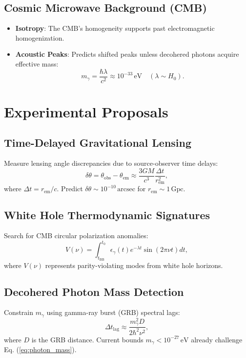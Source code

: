 \documentclass[12pt, a4paper]{article}
\begin{document}
\subsection{Cosmic Microwave Background (CMB)}
\begin{itemize}
\item \textbf{Isotropy}: The CMB's homogeneity supports past electromagnetic homogenization.
\item \textbf{Acoustic Peaks}: Predicts shifted peaks unless decohered photons acquire effective mass:
\begin{equation}
m_{\gamma} = \frac{\hbar \lambda}{c^2} \approx 10^{-33} \, \text{eV} \quad (\lambda \sim H_0). \label{eq:photon_mass}
\end{equation}
\end{itemize}

\section{Experimental Proposals}
\subsection{Time-Delayed Gravitational Lensing}
Measure lensing angle discrepancies due to source-observer time delays:
\begin{equation}
\delta \theta = \theta_{\text{obs}} - \theta_{\text{em}} \approx \frac{3GM}{c^3} \frac{\Delta t}{r_{\text{em}}^2}, \label{eq:lensing}
\end{equation}
where \( \Delta t = r_{\text{em}}/c \). Predict \( \delta \theta \sim 10^{-10} \, \text{arcsec} \) for \( r_{\text{em}} \sim 1 \, \text{Gpc} \).

\subsection{White Hole Thermodynamic Signatures}
Search for CMB circular polarization anomalies:
\begin{equation}
V(\nu) = \int_{t_{\text{BB}}}^{t_0} \epsilon_{\gamma}(t) e^{-\lambda t} \sin\left(2\pi \nu t \right) dt, \label{eq:polarization}
\end{equation}
where \( V(\nu) \) represents parity-violating modes from white hole horizons.

\subsection{Decohered Photon Mass Detection}
Constrain \( m_{\gamma} \) using gamma-ray burst (GRB) spectral lags:
\begin{equation}
\Delta t_{\text{lag}} \approx \frac{m_{\gamma}^2 D}{2\hbar^2 \nu^2}, \label{eq:grb}
\end{equation}
where \( D \) is the GRB distance. Current bounds \( m_{\gamma} < 10^{-27} \, \text{eV} \) already challenge Eq. (\ref{eq:photon_mass}).
\end{document}
